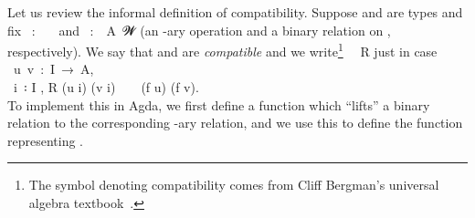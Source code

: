 Let us review the informal definition of compatibility. Suppose  and  are types and fix ~\as :~~~ and ~\as :~~\ab A~\ab 𝓦 (an -ary operation and a binary relation on , respectively). We say that  and  are \emph{compatible} and we write\footnote{The symbol \af{\textbar{}:} denoting compatibility comes from Cliff Bergman's universal algebra textbook~\cite{Bergman:2012}.} ~\af{\textbar{}:}~\ab R just in case ~\ab u~\ab v~\as :~\ab I~\as →~\ab A,\\[-8pt]

~\ab i~\as ꞉ \ab I \af , \ab R (\ab u \ab i) (\ab v \ab i) ~  ~  (\ab f \ab u) (\ab f \ab v).\\[4pt]
To implement this in Agda, we first define a function  which ``lifts'' a binary relation to the corresponding -ary relation, and we use this to define the function \AgdaFunction{|:} representing .
\ccpad
